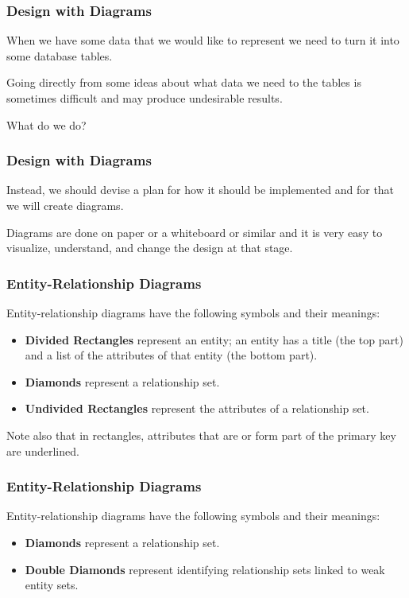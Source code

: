 \begin{frame}
\frametitle{Design with Diagrams}

When we have some data that we would like to represent we need to turn it into some database tables. 

Going directly from some ideas about what data we need to the tables is sometimes difficult and may produce undesirable results. 

What do we do?

\end{frame}



\begin{frame}
\frametitle{Design with Diagrams}

Instead, we should devise a plan for how it should be implemented and for that we will create diagrams. 

Diagrams are done on paper or a whiteboard or similar and it is very easy to visualize, understand, and change the design at that stage.


\end{frame}



\begin{frame}
\frametitle{Entity-Relationship Diagrams}

Entity-relationship diagrams have the following symbols and their meanings:

\begin{itemize}
	\item \textbf{Divided Rectangles} represent an entity; an entity has a title (the top part) and a list of the attributes of that entity (the bottom part).
	\item \textbf{Diamonds} represent a relationship set.
	\item \textbf{Undivided Rectangles} represent the attributes of a relationship set.
	\end{itemize}

Note also that in rectangles, attributes that are or form part of the primary key are underlined. 

\end{frame} 

\begin{frame}
\frametitle{Entity-Relationship Diagrams}

Entity-relationship diagrams have the following symbols and their meanings:

\begin{itemize}
	\item \textbf{Diamonds} represent a relationship set.
	\item \textbf{Double Diamonds} represent identifying relationship sets linked to weak entity sets.
\end{itemize}	

\end{frame}
	
